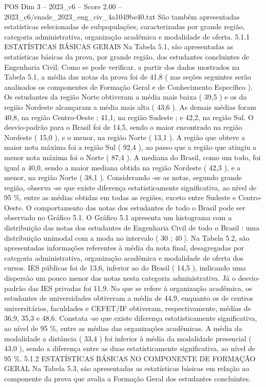 \begin{textsample}{POS Dim 3 – 2023\_c6 – Score 2.00 – 2023\_c6/enade\_2023\_eng\_civ\_4a1049be40.txt}
São também apresentadas estatísticas selecionadas de subpopulações, caracterizadas por grande região, categoria administrativa, organização acadêmica e modalidade de oferta. 5.1.1 ESTATÍSTICAS BÁSICAS GERAIS Na Tabela 5.1, são apresentadas as estatísticas básicas da prova, por grande região, dos estudantes concluintes de Engenharia Civil.
Como se pode verificar, a partir dos dados mostrados na Tabela 5.1, a média das notas da prova foi de 41,8 ( nas seções seguintes serão analisados os componentes de Formação Geral e de Conhecimento Específico ).
Os estudantes da região Norte obtiveram a média mais baixa ( 39,5 ) e os da região Nordeste alcançaram a média mais alta ( 43,6 ).
As demais médias foram 40,8, na região Centro-Oeste ; 41,1, na região Sudeste ; e 42,2, na região Sul.
O desvio-padrão para o Brasil foi de 14,5, sendo o maior encontrado na região Nordeste ( 15,0 ), e o menor, na região Norte ( 13,1 ).
A região que obteve a maior nota máxima foi a região Sul ( 92,4 ), ao passo que a região que atingiu a menor nota máxima foi o Norte ( 87,4 ).
A mediana do Brasil, como um todo, foi igual a 40,0, sendo a maior mediana obtida na região Nordeste ( 42,3 ), e a menor, na região Norte ( 38,1 ).
Considerando -se as notas, segundo grande região, observa -se que existe diferença estatisticamente significativa, ao nível de 95 \%, entre as médias obtidas em todas as regiões, exceto entre Sudeste e Centro-Oeste.
O comportamento das notas dos estudantes de todo o Brasil pode ser observado no Gráfico 5.1.
O Gráfico 5.1 apresenta um histograma com a distribuição das notas dos estudantes de Engenharia Civil de todo o Brasil : uma distribuição unimodal com a moda no intervalo ( 30 ; 40 ].
Na Tabela 5.2, são apresentadas informações referentes à média da nota final, desagregadas por categoria administrativa, organização acadêmica e modalidade de oferta dos cursos.
IES públicas foi de 13,6, inferior ao do Brasil ( 14,5 ), indicando uma dispersão um pouco menor das notas nesta categoria administrativa.
Já o desvio-padrão das IES privadas foi 11,9.
No que se refere à organização acadêmica, os estudantes de universidades obtiveram a média de 44,9, enquanto os de centros universitários, faculdades e CEFET/IF obtiveram, respectivamente, médias de 36,9, 35,3 e 48,6.
Constata -se que existe diferença estatisticamente significativa, ao nível de 95 \%, entre as médias das organizações acadêmicas.
A média da modalidade a distância ( 33,4 ) foi inferior à média da modalidade presencial ( 43,0 ), sendo a diferença entre as duas estatisticamente significativa, ao nível de 95 \%. 5.1.2 ESTATÍSTICAS BÁSICAS NO COMPONENTE DE FORMAÇÃO GERAL Na Tabela 5.3, são apresentadas as estatísticas básicas em relação ao componente da prova que avalia a Formação Geral dos estudantes concluintes.

\end{textsample}
